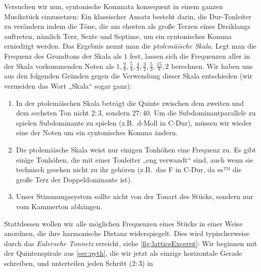 \documentclass[ngerman,11pt]{scrartcl}
\begin{document}
Versuchen wir nun, syntonische Kommata konsequent in einem ganzen Musikstück
einzusetzen: Ein klassischer Ansatz besteht darin, die Dur-Tonleiter zu
verändern indem die Töne, die am ehesten als große Terzen eines Dreiklangs
auftreten, nämlich Terz, Sexte und Septime, um ein syntonisches Komma erniedrigt
werden. Das Ergebnis nennt man die \emph{ptolemäische Skala}. Legt man die
Frequenz des Grundtons der Skala als $1$ fest, lassen sich die Frequenzen aller
in der Skala vorkommenden Noten als 
$1,\frac98,\frac54,\frac43,\frac32,\frac53,\frac{15}8,2$ berechnen. Wir haben uns aus den folgenden Gründen gegen die Verwendung dieser Skala entschieden
(wir vermeiden das Wort „Skala“ sogar ganz):
\begin{enumerate}
\item In der ptolemäischen Skala beträgt die Quinte zwischen dem zweiten und dem
  sechsten Ton nicht $2:3$, sondern $27:40$. Um die Subdominantparallele zu 
  spielen Subdominante zu spielen (z.B.\ d-Moll in C-Dur), müssen wir wieder 
  eine der Noten um ein syntonisches Komma ändern.
\item Die ptolemäische Skala weist nur einigen Tonhöhen eine Frequenz zu. Es 
  gibt einige Tonhöhen, die mit einer Tonleiter „eng verwandt“ sind, auch wenn
  sie technisch gesehen nicht zu ihr gehören (z.B.\ das \sharp F in C-Dur, da
  es™ die große Terz der Doppeldominante ist).
\item Unser Stimmungssystem sollte nicht von der Tonart des Stücks, sondern nur
  vom Kammerton abhängen.
\end{enumerate}
Stattdessen wollen wir alle möglichen Frequenzen eines Stücks in einer Weise
anordnen, die ihre harmonische Distanz widerspiegelt. Dies wird typischerweise
durch das \emph{Eulersche Tonnetz} erreicht, siehe \cref{fig:latticeExcerpt}:
Wir beginnen mit der Quintenspirale aus \ref{sec:pyth}, die wir jetzt als
einzige horizontale Gerade schreiben, und unterteilen jeden Schritt ($2:3$) in
\end{document}
